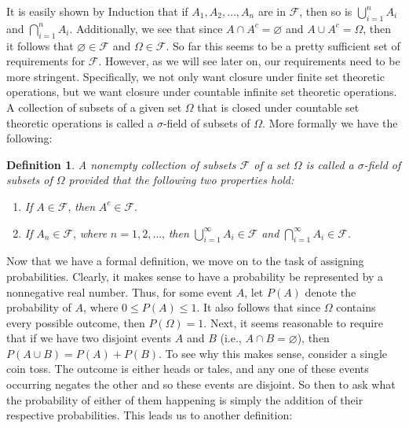 \documentclass{article}
\theoremstyle{definition}
\newtheorem{definition}{Definition}[section]
\theoremstyle{remark}
\theoremstyle{definition}
\begin{document}
\noindent It is easily shown by Induction that if $A_1, A_2,\dots, A_n$ are in $\mathcal{F}$, then so is $\bigcup_{i=1}^{n} A_i$ and $\bigcap_{i=1}^{n} A_i$. Additionally, we see that since $A\cap A^{c}=\varnothing$ and $A\cup A^{c}=\Omega$, then it follows that $\varnothing\in\mathcal{F}$ and $\Omega\in\mathcal{F}$. So far this seems to be a pretty sufficient set of requirements for $\mathcal{F}$. However, as we will see later on, our requirements need to be more stringent. Specifically, we not only want closure under finite set theoretic operations, but we want closure under countable infinite set theoretic operations. A collection of subsets of a given set $\Omega$ that is closed under countable set theoretic operations is called a $\sigma$-field of subsets of $\Omega$. More formally we have the following: 

\begin{definition}
    \textit{A nonempty collection of subsets $\mathcal{F}$ of a set $\Omega$ is called a $\sigma$-field of subsets of $\Omega$ provided that the following two properties hold:} 
    
    \begin{enumerate}[label=(\roman*)]
        \item \textit{If} $A\in\mathcal{F}$, \textit{then} $A^{c}\in\mathcal{F}$.
        \item \textit{If} $A_n\in\mathcal{F}$, \textit{where} $n=1,2,\dots$, \textit{then} $\bigcup_{i=1}^{\infty}A_i\in\mathcal{F}$ \textit{and} $\bigcap_{i=1}^{\infty} A_i\in\mathcal{F}$.
    \end{enumerate}
\end{definition}

Now that we have a formal definition, we move on to the task of assigning probabilities. Clearly, it makes sense to have a probability be represented by a nonnegative real number. Thus, for some event $A$, let $P(A)$ denote the probability of $A$, where $0\leq P(A)\leq 1$. It also follows that since $\Omega$ contains every possible outcome, then $P(\Omega)=1$. Next, it seems reasonable to require that if we have two disjoint events $A$ and $B$ (i.e., $A\cap B=\varnothing$), then $P(A\cup B)=P(A)+P(B)$. To see why this makes sense, consider a single coin toss. The outcome is either heads or tales, and any one of these events occurring negates the other and so these events are disjoint. So then to ask what the probability of either of them happening is simply the addition of their respective probabilities. This leads us to another definition:
\end{document}
